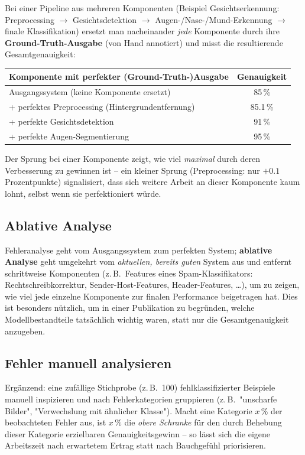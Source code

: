 \documentclass[11pt]{article}
\theoremstyle{csthm}
\theoremstyle{csdef}
\begin{document}
Bei einer Pipeline aus mehreren Komponenten (Beispiel Gesichtserkennung:
Preprocessing $\to$ Gesichtsdetektion $\to$ Augen-/Nase-/Mund-Erkennung
$\to$ finale Klassifikation) ersetzt man nacheinander \emph{jede} Komponente
durch ihre \textbf{Ground-Truth-Ausgabe} (von Hand annotiert) und misst die
resultierende Gesamtgenauigkeit:

\begin{center}
\begin{tabular}{lc}
\toprule
Komponente mit perfekter (Ground-Truth-)Ausgabe & Genauigkeit \\
\midrule
Ausgangssystem (keine Komponente ersetzt) & 85\,\% \\
+ perfektes Preprocessing (Hintergrundentfernung) & 85.1\,\% \\
+ perfekte Gesichtsdetektion & 91\,\% \\
+ perfekte Augen-Segmentierung & 95\,\% \\
\bottomrule
\end{tabular}
\end{center}

Der Sprung bei einer Komponente zeigt, wie viel \emph{maximal} durch deren
Verbesserung zu gewinnen ist -- ein kleiner Sprung (Preprocessing: nur
$+0.1$ Prozentpunkte) signalisiert, dass sich weitere Arbeit an dieser
Komponente kaum lohnt, selbst wenn sie perfektioniert würde.

\subsection{Ablative Analyse}

Fehleranalyse geht vom Ausgangssystem zum perfekten System; \textbf{ablative
Analyse} geht umgekehrt vom \emph{aktuellen, bereits guten} System aus und
entfernt schrittweise Komponenten (z.\,B.\ Features eines Spam-Klassifikators:
Rechtschreibkorrektur, Sender-Host-Features, Header-Features, \ldots), um zu
zeigen, wie viel jede einzelne Komponente zur finalen Performance beigetragen
hat. Dies ist besonders nützlich, um in einer Publikation zu begründen,
welche Modellbestandteile tatsächlich wichtig waren, statt nur die
Gesamtgenauigkeit anzugeben.

\subsection{Fehler manuell analysieren}

Ergänzend: eine zufällige Stichprobe (z.\,B.\ 100) fehlklassifizierter
Beispiele manuell inspizieren und nach Fehlerkategorien gruppieren (z.\,B.\
"unscharfe Bilder", "Verwechslung mit ähnlicher Klasse"). Macht eine
Kategorie $x\,\%$ der beobachteten Fehler aus, ist $x\,\%$ die \emph{obere
Schranke} für den durch Behebung dieser Kategorie erzielbaren
Genauigkeitsgewinn -- so lässt sich die eigene Arbeitszeit nach erwartetem
Ertrag statt nach Bauchgefühl priorisieren.
\end{document}
